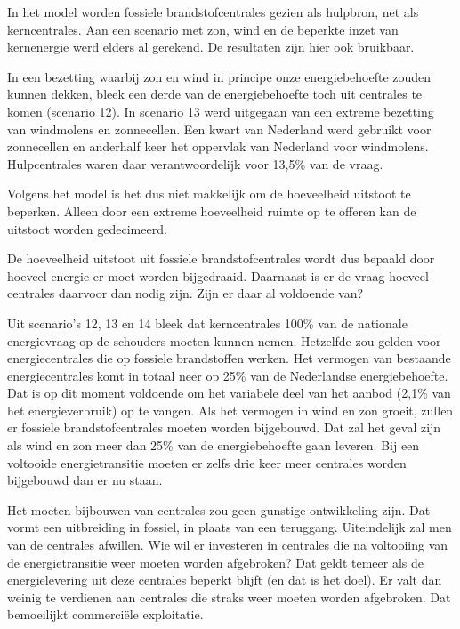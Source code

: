 \documentclass[
  11pt,
  a4paper,
]{book}
\begin{document}
\bigskip\noindent
In het model worden fossiele brandstofcentrales gezien als hulpbron, net als kerncentrales. Aan een scenario met zon, wind en de beperkte inzet van kernenergie werd elders al gerekend. De resultaten zijn hier ook bruikbaar.

In een bezetting waarbij zon en wind in principe onze energiebehoefte zouden kunnen dekken, bleek een derde van de energiebehoefte toch uit centrales te komen (scenario 12). In scenario 13 werd uitgegaan van een extreme bezetting van windmolens en zonnecellen. Een kwart van Nederland werd gebruikt voor zonnecellen en anderhalf keer het oppervlak van Nederland voor windmolens. Hulpcentrales waren daar verantwoordelijk voor 13,5\% van de vraag.

Volgens het model is het dus niet makkelijk om de hoeveelheid uitstoot te beperken. Alleen door een extreme hoeveelheid ruimte op te offeren kan de uitstoot worden gedecimeerd.

De hoeveelheid uitstoot uit fossiele brandstofcentrales wordt dus bepaald door hoeveel energie er moet worden bijgedraaid. Daarnaast is er de vraag hoeveel centrales daarvoor dan nodig zijn. Zijn er daar al voldoende van?

Uit scenario's 12, 13 en 14 bleek dat kerncentrales 100\% van de nationale energievraag op de schouders moeten kunnen nemen. Hetzelfde zou gelden voor energiecentrales die op fossiele brandstoffen werken. Het vermogen van bestaande energiecentrales komt in totaal neer op 25\% van de Nederlandse energiebehoefte. Dat is op dit moment voldoende om het variabele deel van het aanbod (2,1\% van het energieverbruik) op te vangen. Als het vermogen in wind en zon groeit, zullen er fossiele brandstofcentrales moeten worden bijgebouwd. Dat zal het geval zijn als wind en zon meer dan 25\% van de energiebehoefte gaan leveren. Bij een voltooide energietransitie moeten er zelfs drie keer meer centrales worden bijgebouwd dan er nu staan.

Het moeten bijbouwen van centrales zou geen gunstige ontwikkeling zijn. Dat vormt een uitbreiding in fossiel, in plaats van een teruggang. Uiteindelijk zal men van de centrales afwillen. Wie wil er investeren in centrales die na voltooiing van de energietransitie weer moeten worden afgebroken? Dat geldt temeer als de energielevering uit deze centrales beperkt blijft (en dat is het doel). Er valt dan weinig te verdienen aan centrales die straks weer moeten worden afgebroken. Dat bemoeilijkt commerciële exploitatie.

\newpage
\scriptsize
\end{document}
